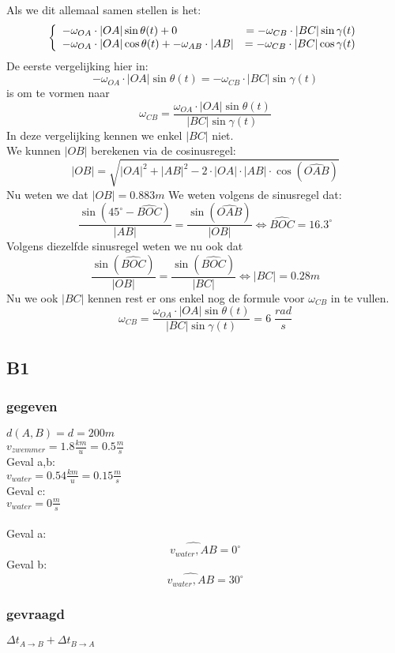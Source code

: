 \documentclass[10pt,a4paper]{article}
\begin{document}
Als we dit allemaal samen stellen is het:
\[
\left\lbrace
\begin{array}{l r}
-\omega_{OA} \cdot |OA|\sin{\theta(t)} + 0 &= -\omega_{CB} \cdot |BC|\sin{\gamma(t)}\\
-\omega_{OA} \cdot |OA|\cos{\theta(t)} + -\omega_{AB} \cdot |AB| &= -\omega_{CB} \cdot |BC|\cos{\gamma(t)}\\
\end{array}
\right.
\]
De eerste vergelijking hier in:
\[
-\omega_{OA} \cdot |OA|\sin{\theta(t)}= -\omega_{CB} \cdot |BC|\sin{\gamma(t)}
\]
is om te vormen naar
\[
\omega_{CB} = \frac{\omega_{OA} \cdot |OA|\sin{\theta(t)}}{|BC|\sin{\gamma(t)}}
\]
In deze vergelijking kennen we enkel $|BC|$ niet.\\
We kunnen $|OB|$ berekenen via de cosinusregel:
\[
|OB| = \sqrt{|OA|^{2} + |AB|^{2} - 2 \cdot |OA| \cdot |AB| \cdot \cos(\hat{OAB})}
\]
Nu weten we dat $|OB| = 0.883m$
We weten volgens de sinusregel dat:
\[
\frac{\sin(45^\circ-\hat{BOC})}{|AB|} = \frac{\sin(\hat{OAB})}{|OB|} \Leftrightarrow \hat{BOC} = 16.3^\circ
\]
Volgens diezelfde sinusregel weten we nu ook dat
\[
\frac{\sin(\hat{BOC})}{|OB|} = \frac{\sin(\hat{BOC})}{|BC|}
\Leftrightarrow |BC| = 0.28m
\]
Nu we ook $|BC|$ kennen rest er ons enkel nog de formule voor $\omega_{CB}$ in te vullen.
\[
\omega_{CB} = \frac{\omega_{OA} \cdot |OA|\sin{\theta(t)}}{|BC|\sin{\gamma(t)}} = 6\;\frac{rad}{s}
\]

\subsection{B1}
\subsubsection*{gegeven}
$d(A,B) = d = 200m$\\
$v_{zwemmer}=1.8\frac{km}{u}=0.5\frac{m}{s}$\\
Geval a,b:\\
$v_{water}= 0.54\frac{km}{u}=0.15\frac{m}{s}$\\
Geval c:\\
$v_{water}= 0\frac{m}{s}$\\\\
Geval a: \[\widehat{v_{water},AB} = 0^\circ\]
Geval b: \[\widehat{v_{water},AB} = 30^\circ\]

\subsubsection*{gevraagd}
$\Delta t_{A\rightarrow B} + \Delta t_{B\rightarrow A}$
\end{document}
